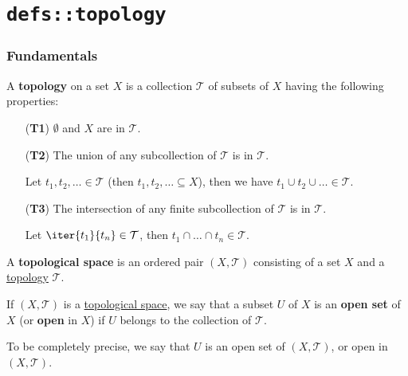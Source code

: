 \chapter{\texttt{defs::topology}}\label{f64f6ad}

\begin{toc}
\end{toc}

\subsection{Fundamentals}\label{a199974}

\label{cc8eb8b}

A \textbf{topology} on a set $X$ is a collection $\mathcal T$ of subsets of $X$
having the following properties:
\begin{itemize}
  \item[(\textbf{T1})] $\emptyset$ and $X$ are in $\mathcal T$.
  \item[(\textbf{T2})] The union of any subcollection of $\mathcal T$ is in
        $\mathcal T$.

        Let $t_1,t_2,\ldots\in\mathcal T$ (then $t_1,t_2,\ldots\subseteq X$),
        then we have $t_1\cup t_2\cup\ldots\in\mathcal T$.
  \item[(\textbf{T3})] The intersection of any finite subcollection of $\mathcal
        T$ is in $\mathcal T$.

        Let $\iter{t_1}{t_n}\in\mathcal T$, then $t_1\cap\ldots\cap
        t_n\in\mathcal T$.
\end{itemize}

\label{de3c1b1}

A \textbf{topological space} is an ordered pair $(X,\mathcal T)$ consisting of
a set $X$ and a \href{cc8eb8b}{topology} $\mathcal T$.

\label{c4490f8}

If $(X,\mathcal T)$ is a \href{de3c1b1}{topological space}, we say that a
subset $U$ of $X$ is an \textbf{open set} of $X$ (or \textbf{open} in $X$) if
$U$ belongs to the collection of $\mathcal T$.

To be completely precise, we say that $U$ is an open set of $(X,\mathcal T)$,
or open in $(X,\mathcal T)$.

\label{a7c8870}

